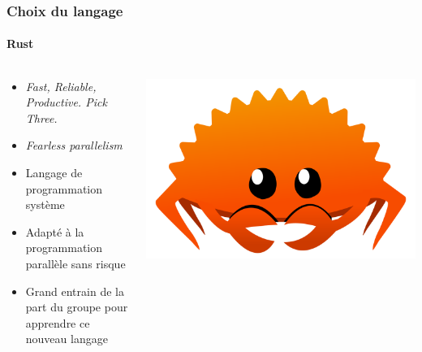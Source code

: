 \documentclass{beamer}
\begin{document}
\begin{frame}
    \frametitle{Choix du langage}
    \framesubtitle{Rust}

    \begin{columns}
        \begin{column}{0.7\textwidth}
            \begin{itemize}
                \item \textit{Fast, Reliable, Productive. Pick Three.}
                \item \textit{Fearless parallelism}
                \item Langage de programmation système
                \item Adapté à la programmation parallèle sans risque
                \item Grand entrain de la part du groupe pour apprendre ce nouveau langage
            \end{itemize}
        \end{column}
        \begin{column}{0.3\textwidth}
            \includegraphics[width=\textwidth,height=0.2\textheight,keepaspectratio]{ferris.png}
        \end{column}
    \end{columns}
\end{frame}
\end{document}
